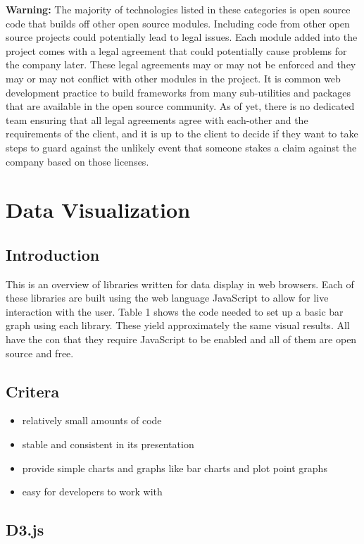 \documentclass[draftclsnofoot,onecolumn,letterpaper,10pt,compsoc]{IEEEtran}
\begin{document}
  \textbf{Warning:}
  The majority of technologies listed in these categories is open source code that builds off other open source modules.
  Including code from other open source projects could potentially lead to legal issues.
  Each module added into the project comes with a legal agreement that could potentially cause problems for the company later.
  These legal agreements may or may not be enforced and they may or may not conflict with other modules in the project.
  It is common web development practice to build frameworks from many sub-utilities and packages that are available in the open source community.
  As of yet, there is no dedicated team ensuring that all legal agreements agree with each-other and the requirements of the client, and it is up to the client to decide if they want to take steps to guard against the unlikely event that someone stakes a claim against the company based on those licenses.

\section{Data Visualization}
  \subsection{Introduction}
      This is an overview of libraries written for data display in web browsers.
      Each of these libraries are built using the web language JavaScript to allow for live interaction with the user.
      Table 1 shows the code needed to set up a basic bar graph using each library.
      These yield approximately the same visual results.
      All have the con that they require JavaScript to be enabled and all of them are open source and free.

  \subsection{Critera}
  \begin{itemize}
    \item relatively small amounts of code
    \item stable and consistent in its presentation
    \item provide simple charts and graphs like bar charts and plot point graphs
    \item easy for developers to work with
  \end{itemize}

  \subsection{D3.js}
\end{document}
